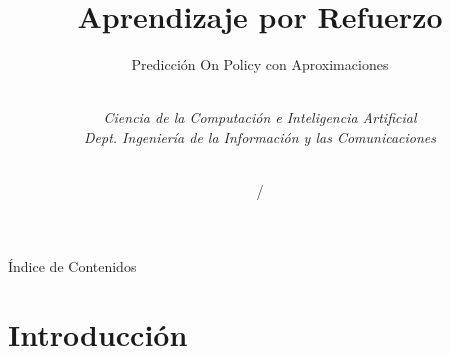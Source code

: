 \documentclass[10pt, envcountsect, handout, aspectratio=1610, hyperref={hypertexnames=true}]{beamer}
\title[Aprendizaje por Refuerzo]{Aprendizaje por Refuerzo}
\subtitle{Predicción On Policy con Aproximaciones} %
\author[L. D. Hernández] %
{%
	\sc{Luis Daniel Hernández Molinero }\\ %
	\textit{Ciencia de la Computación e Inteligencia Artificial}\\  %
	\textit{Dept. Ingeniería de la Información y las Comunicaciones}\\  %
	\\   %
}
\institute[DIIC]%
{
	\textit{Universidad de Murcia}
}
\date{\arabic{lastyear} / \the\year} %
\begin{document}
	






\begin{frame}[plain]
	\titlepage
\end{frame}


\begin{frame}{Índice de Contenidos}
	\tableofcontents 
	
\note{

}

\end{frame}










\section{Introducción}
\end{document}
